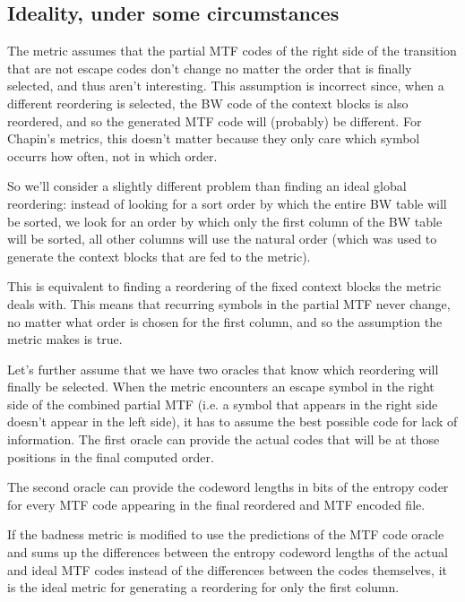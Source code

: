 \documentclass[a4paper]{scrreprt}
\begin{document}
\subsection{Ideality, under some circumstances}

The metric assumes that the partial MTF codes of the right side of the
transition that are not escape codes don't change no matter the order that is
finally selected, and thus aren't interesting. This assumption is incorrect
since, when a different reordering is selected, the BW code of the context
blocks is also reordered, and so the generated MTF code will (probably) be
different. For Chapin's metrics, this doesn't matter because they only care
which symbol occurrs how often, not in which order.

So we'll consider a slightly different problem than finding an ideal global
reordering: instead of looking for a sort order by which the entire BW table
will be sorted, we look for an order by which only the first column of the BW
table will be sorted, all other columns will use the natural order (which was
used to generate the context blocks that are fed to the metric).


This is equivalent to finding a reordering of the fixed context blocks the
metric deals with. This means that recurring symbols in the partial MTF never
change, no matter what order is chosen for the first column, and so the
assumption the metric makes is true.

Let's further assume that we have two oracles that know which reordering will
finally be selected. When the metric encounters an escape symbol in the right
side of the combined partial MTF (i.e. a symbol that appears in the right side
doesn't appear in the left side), it has to assume the best possible code for
lack of information. The first oracle can provide the actual codes that will be
at those positions in the final computed order.

The second oracle can provide the codeword lengths in bits of the entropy coder
for every MTF code appearing in the final reordered and MTF encoded file.

If the badness metric is modified to use the predictions of the MTF code oracle
and sums up the differences between the entropy codeword lengths of the actual
and ideal MTF codes instead of the differences between the codes themselves, it
is the ideal metric for generating a reordering for only the first column.
\end{document}
